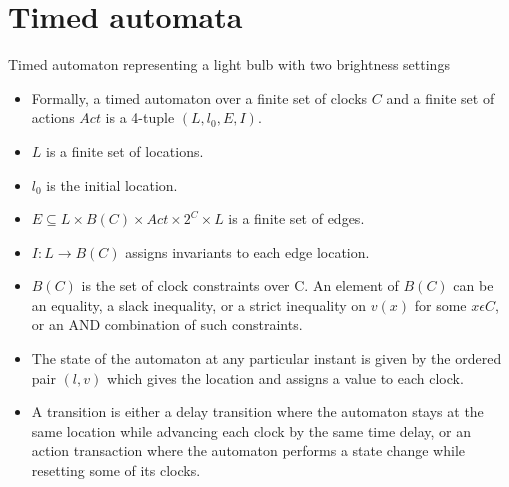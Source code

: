 \documentclass{article}
\begin{document}
  \section{Timed automata}

  
  Timed automaton representing a light bulb with two
  brightness settings

  \begin{itemize}
  \item Formally, a timed automaton over a finite set of clocks $C$
    and a finite set of actions $Act$ is a 4-tuple $(L, l_{0}, E, I)$.
  \item $L$ is a finite set of locations.
  \item $l_{0}$ is the initial location.
  \item $E \subseteq L \times B(C) \times Act \times 2^{C} \times L$
    is a finite set of edges.
  \item $I: L \rightarrow B(C)$ assigns invariants to each edge
    location.
  \item $B(C)$ is the set of clock constraints over C. An element of $B(C)$
    can be an equality, a slack inequality, or a strict inequality on
    $v(x)$ for some $x \epsilon C$, or
    an AND combination of such constraints.
  \item The state of the automaton at any particular instant is given
    by the ordered pair $(l, v)$ which gives the location and assigns
    a value to each clock. 
  \item A transition is either a delay transition where the automaton
    stays at the same location while advancing each clock by the same
    time delay, or an action transaction where the automaton performs a
    state change while resetting some of its clocks.
  \end{itemize}
  
\end{document}
